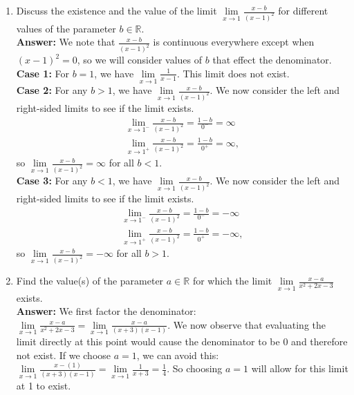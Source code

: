 \documentclass{article}
\begin{document}
\begin{enumerate}
        \item Discuss the existence and the value of the limit $\lim\limits_{x \to 1} \frac{x-b}{(x-1)^2}$ for different values of the parameter $b \in \mathbb{R}$.\\
        \textbf{Answer: }We note that $\frac{x-b}{(x-1)^2}$ is continuous everywhere except when $(x-1)^2 = 0$, so we will consider values of $b$ that effect the denominator.\\
        \textbf{Case 1: }For $b = 1$, we have $\lim\limits_{x \to 1} \frac{1}{x-1}$. This limit does not exist.\\
        \textbf{Case 2: }For any $b > 1$, we have $\lim\limits_{x \to 1} \frac{x-b}{(x-1)^2}$. We now consider the left and right-sided limits to see if the limit exists.
            \begin{align*}
                \lim\limits_{x \to 1^-} \frac{x-b}{(x-1)^2} = \frac{1-b}{0^-} = \infty\\
                \lim\limits_{x \to 1^+} \frac{x-b}{(x-1)^2} = \frac{1-b}{0^+} = \infty,
            \end{align*}
        so $\lim\limits_{x \to 1} \frac{x-b}{(x-1)^2} = \infty$ for all $b < 1$.\\
        
        \textbf{Case 3: }For any $b < 1$, we have $\lim\limits_{x \to 1} \frac{x-b}{(x-1)^2}$. We now consider the left and right-sided limits to see if the limit exists.
            \begin{align*}
                \lim\limits_{x \to 1^-} \frac{x-b}{(x-1)^2} = \frac{1-b}{0^-} = -\infty\\
                \lim\limits_{x \to 1^+} \frac{x-b}{(x-1)^2} = \frac{1-b}{0^+} = -\infty,
            \end{align*}
        so $\lim\limits_{x \to 1} \frac{x-b}{(x-1)^2} = -\infty$ for all $b > 1$.\\
        
        \item Find the value(s) of the parameter $a \in \mathbb{R}$ for which the limit $\lim\limits_{x \to 1} \frac{x-a}{x^2+2x-3}$ exists.\\
        \textbf{Answer: }We first factor the denominator: $\lim\limits_{x \to 1} \frac{x-a}{x^2+2x-3} = \lim\limits_{x \to 1} \frac{x-a}{(x+3)(x-1)}$. We now observe that evaluating the limit directly at this point would cause the denominator to be $0$ and therefore not exist. If we choose $a=1$, we can avoid this: $\lim\limits_{x \to 1} \frac{x-(1)}{(x+3)(x-1)} = \lim\limits_{x \to 1} \frac{1}{x+3} = \frac{1}{4}$. So choosing $a=1$ will allow for this limit at 1 to exist.
        

\end{enumerate}
\end{document}
